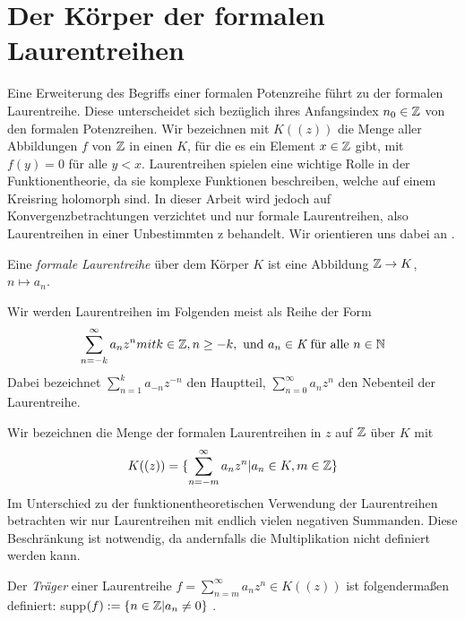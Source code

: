 \section{Der Körper der formalen Laurentreihen}
%
Eine Erweiterung des Begriffs einer formalen Potenzreihe führt zu der formalen Laurentreihe. Diese unterscheidet sich bezüglich ihres Anfangsindex $n_0 \in \mathbb{Z}$ von den formalen Potenzreihen. Wir bezeichnen mit $K((z))$ die Menge aller Abbildungen $f$ von $\mathbb{Z}$ in einen $K$, für die es ein Element $x \in \mathbb{Z}$ gibt, mit $f(y) = 0$ für alle $y < x $. \newline 
Laurentreihen spielen eine wichtige Rolle in der Funktionentheorie, da sie komplexe Funktionen beschreiben, welche auf einem Kreisring holomorph sind. In dieser Arbeit wird jedoch auf Konvergenzbetrachtungen verzichtet und nur formale Laurentreihen, also Laurentreihen in einer Unbestimmten z behandelt. %
Wir orientieren uns dabei an \cite[S. 563 - 572]{Lueneburg08}.
%
\begin{defn}
Eine \textit{formale Laurentreihe} über dem Körper $K$ ist eine Abbildung $\mathbb{Z} \rightarrow K$, $n \mapsto a_n$.
\end{defn}
%
%
\begin{bem}
Wir werden Laurentreihen im Folgenden meist als Reihe der Form
\begin{equation*}
\sum_{n= - k}^{\infty}a_nz^n mit k \in \mathbb{Z}, n \ge -k, \text{ und }a_n \in\textit{K}\text{ für alle } n\in\mathbb{N} 
\end{equation*} 
Dabei bezeichnet $\sum_{n=1}^{k}a_{-n}z^{-n}$ den Hauptteil, $\sum_{n=0}^{\infty}a_nz^n$ den Nebenteil der Laurentreihe. 
\end{bem}
%
Wir bezeichnen die Menge der formalen Laurentreihen in $z$ auf $\mathbb{Z}$ über $K$ mit
\begin{equation*} %
K((z)) = \lbrace \sum_{n =-m}^{\infty} a_nz^n \vert a_n \in K, m \in \Z\rbrace
\end{equation*} 
%
%
%
%
%
%
Im Unterschied zu der funktionentheoretischen Verwendung der Laurentreihen betrachten wir nur Laurentreihen mit endlich vielen negativen Summanden. Diese Beschränkung ist notwendig, da andernfalls die Multiplikation nicht definiert werden kann.
%
%
%
% 
\begin{defn}\label{traeger}
Der \textit{Träger} einer Laurentreihe $f = \sum_{n =m}^{\infty} a_nz^n \in K((z))$ ist folgendermaßen definiert: supp$(f) := \lbrace n \in \mathbb{Z} | a_n \neq 0 \rbrace$ . 
\end{defn}
